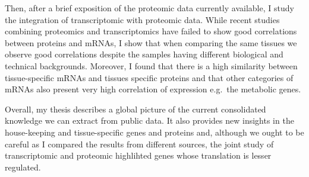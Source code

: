 \begin{singlespace}
\begin{small}
    Then, after a brief exposition of the proteomic data currently available, I
    study the integration of transcriptomic with proteomic data. While recent
    studies combining proteomics and transcriptomics have failed to show good
    correlations between proteins and mRNAs, I show that when comparing the
    same tissues we observe good correlations despite the samples having
    different biological and technical backgrounds. Moreover, I found that there
    is a high similarity between tissue-specific mRNAs and tissues specific
    proteins and that other categories of mRNAs also present very high
    correlation of expression e.g.\ the metabolic genes.

    Overall, my thesis describes a global picture of the current consolidated
    knowledge we can extract from public data. It also provides new insights in
    the house-keeping and tissue-specific genes and proteins and, although we
    ought to be careful as I compared the results from different sources, the
    joint study of transcriptomic and proteomic highlihted genes whose
    translation is lesser regulated.

    \end{small}
\end{singlespace}
